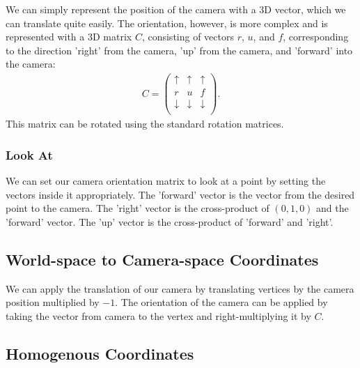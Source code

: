 We can simply represent the position of the camera with a 3D vector,
which we can translate quite easily.
The orientation, however, is more complex and is represented with a 3D matrix $C$, 
consisting of vectors $r$, $u$, and $f$, corresponding to the direction
'right' from the camera, 'up' from the camera, and 'forward'
into the camera: \begin{align*}
    C = \begin{pmatrix}
        \uparrow & \uparrow & \uparrow \\
        r & u & f \\
        \downarrow & \downarrow & \downarrow \\
    \end{pmatrix}.
\end{align*} This matrix can be rotated using the standard rotation matrices.

\subsubsection{Look At}

We can set our camera orientation matrix to look at a point by setting the
vectors inside it appropriately. The 'forward' vector is the vector from the
desired point to the camera. The 'right' vector is the cross-product of
$(0, 1, 0)$ and the 'forward' vector. The 'up' vector is the cross-product
of 'forward' and 'right'.

\subsection{World-space to Camera-space Coordinates}

We can apply the translation of our camera by translating vertices by the
camera position multiplied by $-1$. The orientation of the camera can
be applied by taking the vector from camera to the vertex and right-multiplying
it by $C$.

\subsection{Homogenous Coordinates}

